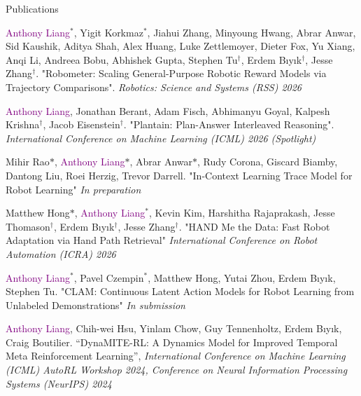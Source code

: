\documentclass{resume}
\begin{document}
\begin{rSection}{Publications}
\begin{etaremune}

\item \textcolor{purple}{Anthony Liang}$^{*}$, Yigit Korkmaz$^{*}$, Jiahui Zhang, Minyoung Hwang, Abrar Anwar, Sid Kaushik, Aditya Shah, Alex Huang, Luke Zettlemoyer, Dieter Fox, Yu Xiang, Anqi Li, Andreea Bobu, Abhishek Gupta, Stephen Tu$^{\dag}$, Erdem Bıyık$^{\dag}$, Jesse Zhang$^{\dag}$. "Robometer: Scaling General-Purpose Robotic Reward Models via Trajectory Comparisons". \textit{Robotics: Science and Systems (RSS) 2026}

\item \textcolor{purple}{Anthony Liang}, Jonathan Berant, Adam Fisch, Abhimanyu Goyal, Kalpesh Krishna$^{\dag}$, Jacob Eisenstein$^{\dag}$. "Plantain: Plan-Answer Interleaved Reasoning". \textit{International Conference on Machine Learning (ICML) 2026 (Spotlight)}

\item Mihir Rao$\text{*}$, \textcolor{purple}{Anthony Liang}$\text{*}$, Abrar Anwar$\text{*}$, Rudy Corona, Giscard Biamby, Dantong Liu, Roei Herzig, Trevor Darrell. "In-Context Learning Trace Model for Robot Learning" \textit{In preparation}

\item Matthew Hong$\text{*}$, \textcolor{purple}{Anthony Liang}$^{*}$, Kevin Kim, Harshitha Rajaprakash, Jesse Thomason$^{\dag}$, Erdem Bıyık$^{\dag}$, Jesse Zhang$^{\dag}$. "HAND Me the Data: Fast Robot Adaptation via Hand Path Retrieval" \textit{International Conference on Robot Automation (ICRA) 2026}

\item \textcolor{purple}{Anthony Liang}$^{*}$, Pavel Czempin$^{*}$, Matthew Hong, Yutai Zhou, Erdem Bıyık, Stephen Tu. "CLAM: Continuous Latent Action Models for Robot Learning from Unlabeled Demonstrations" \textit{In submission}

\item \textcolor{purple}{Anthony Liang}, Chih-wei Hsu, Yinlam Chow, Guy Tennenholtz, Erdem Bıyık, Craig Boutilier. ``DynaMITE-RL: A Dynamics Model for Improved Temporal Meta Reinforcement Learning'', \textit{International Conference on Machine Learning (ICML) AutoRL Workshop 2024, Conference on Neural Information Processing Systems (NeurIPS) 2024}


\end{etaremune}
\end{rSection}
\end{document}

